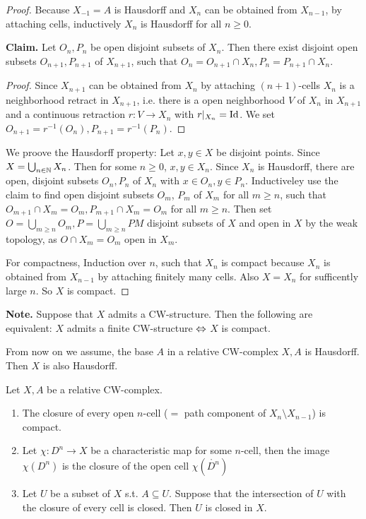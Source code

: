 \documentclass{TemplateLecture}
\begin{document}
\begin{proof}
    Because \(X_{-1} = A\) is Hausdorff and \(X_n\) can be obtained from \(X_{n-1}\), by attaching cells, inductively \(X_n\) is Hausdorff for all \(n \geq 0\).

    \textbf{Claim.} Let \(O_n, P_n\) be open disjoint subsets of \(X_n\). Then there exist disjoint open subsets \(O_{n+1}, P_{n+1}\) of \(X_{n+1}\), such that \(O_n = O_{n+1} \cap X_n, P_n = P_{n+1} \cap X_n\).
    \begin{proof}
        Since \(X_{n+1}\) can be obtained from \(X_n\) by attaching \((n+1)\)-cells \(X_n\) is a neighborhood retract in \(X_{n+1}\), i.e. there is a open neighborhood \(V\) of \(X_n\) in \(X_{n+1}\) and a continuous retraction \(r\colon V\to X_n\) with \(r \rvert_{X_n} = \mathrm{Id}\). We set \(O_{n+1} = r^{-1}(O_n), P_{n+1} = r^{-1}(P_n)\).
    \end{proof}
    We proove the Hausdorff property: Let \(x,y \in X\) be disjoint points. Since \(X = \bigcup_{n \in \mathbb{N}} X_n\). Then for some \(n \geq 0\), \(x,y \in X_n\). Since \(X_n\) is Hausdorff, there are open, disjoint subsets \(O_n, P_n\) of \(X_n\) with \(x \in O_n, y \in P_n\). Inductiveley use the claim to find open disjoint subsets \(O_m\), \(P_m\) of \(X_m\) for all \(m \geq n\), such that \(O_{m+1} \cap X_m = O_m, P_{m+1} \cap X_m = O_m\) for all \(m \geq n\). Then set \(O = \bigcup_{m \geq n} O_m, P = \bigcup_{m\geq n} PM\) disjoint subsets of \(X\) and open in \(X\) by the weak topology, as \(O\cap X_m = O_m\) open in \(X_m\).

    For compactness, Induction over \(n\), such that \(X_n\) is compact because \(X_n\) is obtained from \(X_{n-1}\) by attaching finitely many cells. Also \(X = X_n\) for sufficently large \(n\). So \(X\) is compact.
\end{proof}

\textbf{Note.} Suppose that \(X\) admits a CW-structure. Then the following are equivalent: \(X\) admits a finite CW-structure \(\Leftrightarrow\) \(X\) is compact.

From now on we assume, the base \(A\) in a relative CW-complex \(X,A\) is Hausdorff. Then \(X\) is also Hausdorff.

\begin{thm}{}{}
    Let \(X,A\) be a relative CW-complex.
    \begin{enumerate}
        \item The closure of every open \(n\)-cell (\(=\) path component of \(X_n\setminus X_{n-1}\)) is compact.
        \item Let \(\chi\colon D^n \to X\) be a characteristic map for some \(n\)-cell, then  the image \(\chi(D^n)\) is the closure of the open cell \(\chi(\mathring{D^n})\)
        \item Let \(U\) be a subset of \(X\) s.t. \(A\subseteq U\). Suppose that the intersection of \(U\) with the closure of every cell is closed. Then \(U\) is closed in \(X\).
    \end{enumerate}
\end{thm}
\end{document}
